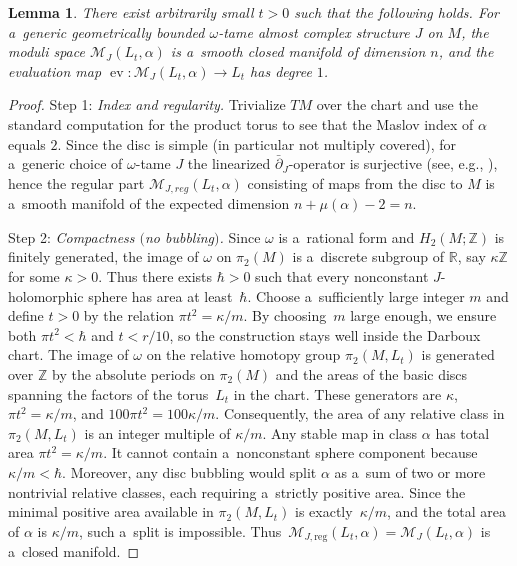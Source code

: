 \documentclass[pdftex]{sigma}
\numberwithin{equation}{section}
\newcommand{\ev}{\operatorname{ev}}
\newtheorem{lm}[Theorem]{Lemma}
\theoremstyle{definition}
\begin{document}
\begin{lm}\label{lem:degree-one}
There exist arbitrarily small $t > 0$ such that the following holds.
For a~generic geometrically bounded $\omega$-tame almost complex structure $J$ on $M$, the moduli space $\mathcal{M}_{J}(L_t,\alpha)$ is a~smooth closed manifold of dimension $n$, and the evaluation map $\ev\colon\mathcal{M}_{J}(L_t,\alpha)\to L_t$ has degree $1$.
\end{lm}
\begin{proof}
Step 1: \emph{Index and regularity.}
Trivialize $TM$ over the chart and use the standard computation for the product torus to see that the Maslov index of $\alpha$ equals $2$.
Since the disc is simple (in particular not multiply covered), for a~generic choice of $\omega$-tame $J$ the linearized $\bar\partial_J$-operator is surjective (see, e.g., \cite{McDuffSalamonJHol}), hence the regular part $\mathcal{M}_{J,reg}(L_t,\alpha)$ consisting of maps from the disc to $M$ is a~smooth manifold of the expected dimension $n+\mu(\alpha)-2=n$.

Step 2: \emph{Compactness $($no bubbling$)$.}
Since $\omega$ is a~rational form and $H_2(M; \mathbb{Z})$ is finitely generated, the image of $\omega$ on $\pi_2(M)$ is a~discrete subgroup of $\mathbb{R}$, say $\kappa\mathbb{Z}$ for some $\kappa > 0$. Thus there exists $\hbar > 0$ such that every nonconstant $J$-holomorphic sphere has area at least~$\hbar$. Choose a~sufficiently large integer $m$ and define $t > 0$ by the relation $\pi t^2 = \kappa / m$. By choosing~$m$ large enough, we ensure both $\pi t^2 < \hbar$ and $t < r/10$, so the construction stays well inside the Darboux chart. The image of $\omega$ on the relative homotopy group $\pi_2(M, L_t)$ is generated over $\mathbb{Z}$ by the absolute periods on $\pi_2(M)$ and the areas of the basic discs spanning the factors of the torus~$L_t$ in the chart. These generators are $\kappa$, $\pi t^2 = \kappa / m$, and $100\pi t^2 = 100\kappa / m$. Consequently, the area of any relative class in $\pi_2(M, L_t)$ is an integer multiple of $\kappa / m$.
 Any stable map in class $\alpha$ has total area $\pi t^2 = \kappa / m$. It cannot contain a~nonconstant sphere component because~${\kappa / m < \hbar}$. Moreover, any disc bubbling would split $\alpha$ as a~sum of two or more nontrivial relative classes, each requiring a~strictly positive area. Since the minimal positive area available in $\pi_2(M, L_t)$ is exactly~${\kappa / m}$, and the total area of $\alpha$ is $\kappa / m$, such a~split is impossible. Thus~${\mathcal{M}_{J,\text{reg}}(L_t, \alpha) = \mathcal{M}_J(L_t, \alpha)}$ is a~closed manifold.


\end{proof}
\end{document}
